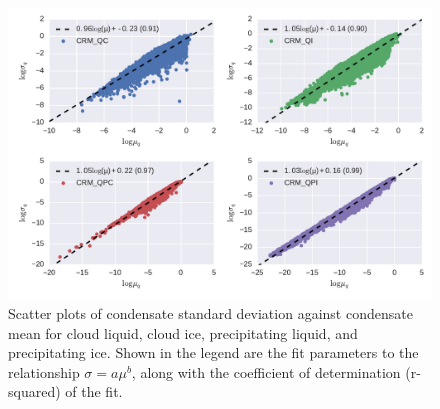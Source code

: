 \begin{figure}
\centering
\includegraphics[width=\columnwidth]{graphics/condensate_std.pdf}
\caption{Scatter plots of condensate standard deviation against condensate mean for cloud liquid, cloud ice, precipitating liquid, and precipitating ice. Shown in the legend are the fit parameters to the relationship $\sigma = a \mu^b$, along with the coefficient of determination (r-squared) of the fit.}
\label{sgi_standard_deviation}
\end{figure}


